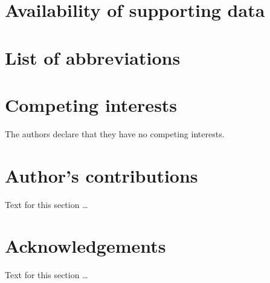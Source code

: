 \documentclass[twocolumn]{bmcart}%
\begin{document}
\begin{backmatter}

\section*{Availability of supporting data}
\section*{List of abbreviations}


\section*{Competing interests}
  The authors declare that they have no competing interests.

\section*{Author's contributions}
    Text for this section \ldots

\section*{Acknowledgements}
  Text for this section \ldots




\end{backmatter}
\end{document}
